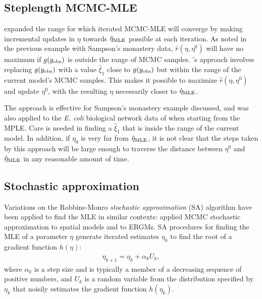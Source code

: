 \subsection{Steplength MCMC-MLE} \label{S:Hummel}
\citet{Hummel} expanded the range for which iterated MCMC-MLE will converge by
making incremental updates in $\eta$ towards $\hat{\eta}_{\textrm{MLE}}$ possible at each iteration.  
As noted in the 
previous example with 
Sampson's monastery data, $\hat{r}(\eta,\eta^0)$ 
will have no maximum if $g(y_{\text{obs}})$ is outside the range of MCMC samples.  
\citeauthor{Hummel}'s approach involves 
replacing $g(y_{\text{obs}})$ with a value $\hat{\xi}_1$ close to $g(y_{\text{obs}})$ but within
the range of the current model's MCMC samples.
This makes it possible to maximize $\hat{r}(\eta,\eta^0)$ and update $\eta^0$,
with the resulting $\eta$ necessarily closer to $\hat{\eta}_{\textrm{MLE}}$.

The approach is effective for Sampson's monastery example discussed, and was also applied
to the \emph{E. coli} biological network data of \citet{Shen-Orr} when 
starting from the MPLE.  Care is needed in finding a $\hat{\xi}_1$ that is inside
the range of the current model. In addition, if $\eta_0$ is very far from $\hat{\eta}_{\textrm{MLE}}$, it is 
not clear that the steps taken by this approach will be large enough to traverse
the distance between $\eta^0$ and $\hat{\eta}_{\textrm{MLE}}$ in any reasonable amount of time.



%

    
\subsection{Stochastic approximation}

Variations on the Robbins-Monro \emph{stochastic approximation} (SA) algorithm 
\citep{Robbins-Monro} have been applied to find the MLE in similar contexts: 
\citet{Younes:1988,Younes:1989,Moyeed:1991,Gu:2001}
applied MCMC stochastic approximation to spatial models and \citet{Snijders:2002} to 
ERGMs.
SA procedures for finding the MLE of a parameter $\eta$ generate iterated estimates 
$\eta_k$ to find the 
root of a gradient function $h(\eta)$:
\begin{align} \label{E:eta SA update}
	\eta_{k+1} = \eta_k + \alpha_k U_k,
\end{align}
where $\alpha_k$ is a step size and is typically a member of a decreasing sequence of 
positive numbers, and $U_k$ is a 
random variable from the distribution specified by $\eta_k$ that noisily estimates the 
gradient function $h(\eta_k)$.  

